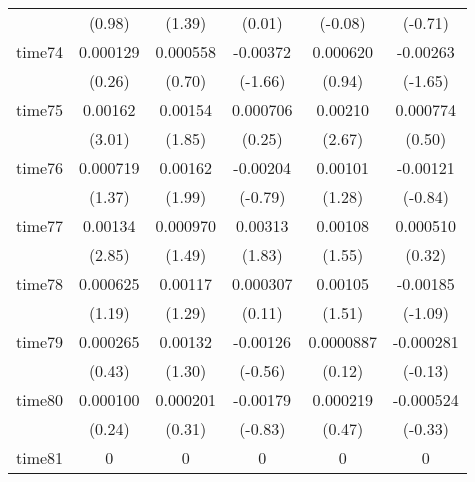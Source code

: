 \begin{table}[htbp]
\begin{tabular}{l*{5}{c}}
            &      (0.98)         &      (1.39)         &      (0.01)         &     (-0.08)         &     (-0.71)         \\
time74      &    0.000129         &    0.000558         &    -0.00372         &    0.000620         &    -0.00263         \\
            &      (0.26)         &      (0.70)         &     (-1.66)         &      (0.94)         &     (-1.65)         \\
time75      &     0.00162\sym{**} &     0.00154         &    0.000706         &     0.00210\sym{**} &    0.000774         \\
            &      (3.01)         &      (1.85)         &      (0.25)         &      (2.67)         &      (0.50)         \\
time76      &    0.000719         &     0.00162\sym{*}  &    -0.00204         &     0.00101         &    -0.00121         \\
            &      (1.37)         &      (1.99)         &     (-0.79)         &      (1.28)         &     (-0.84)         \\
time77      &     0.00134\sym{**} &    0.000970         &     0.00313         &     0.00108         &    0.000510         \\
            &      (2.85)         &      (1.49)         &      (1.83)         &      (1.55)         &      (0.32)         \\
time78      &    0.000625         &     0.00117         &    0.000307         &     0.00105         &    -0.00185         \\
            &      (1.19)         &      (1.29)         &      (0.11)         &      (1.51)         &     (-1.09)         \\
time79      &    0.000265         &     0.00132         &    -0.00126         &   0.0000887         &   -0.000281         \\
            &      (0.43)         &      (1.30)         &     (-0.56)         &      (0.12)         &     (-0.13)         \\
time80      &    0.000100         &    0.000201         &    -0.00179         &    0.000219         &   -0.000524         \\
            &      (0.24)         &      (0.31)         &     (-0.83)         &      (0.47)         &     (-0.33)         \\
time81      &           0         &           0         &           0         &           0         &           0         \\

\end{tabular}
\end{table}
